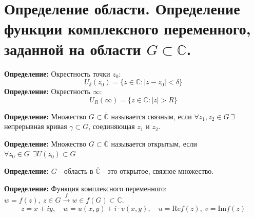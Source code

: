 \section{\texorpdfstring{Определение области. Определение функции
комплексного переменного, заданной на области
\(G \subset \mathbb{C}\).}{Определение области. Определение функции комплексного переменного, заданной на области G \textbackslash subset \textbackslash mathbb\{C\}.}}\label{ux43eux43fux440ux435ux434ux435ux43bux435ux43dux438ux435-ux43eux431ux43bux430ux441ux442ux438.-ux43eux43fux440ux435ux434ux435ux43bux435ux43dux438ux435-ux444ux443ux43dux43aux446ux438ux438-ux43aux43eux43cux43fux43bux435ux43aux441ux43dux43eux433ux43e-ux43fux435ux440ux435ux43cux435ux43dux43dux43eux433ux43e-ux437ux430ux434ux430ux43dux43dux43eux439-ux43dux430-ux43eux431ux43bux430ux441ux442ux438-g-subset-mathbbc.}

\textbf{Определение:} Окрестность точки \(z_{0}\): \[
U_{\delta}(z_{0})=\{ z\in \mathbb{C}:|z-z_{0}|<\delta \}
\] \textbf{Определение:} Окрестность \(\infty\): \[
U_{R}(\infty)=\{ z\in \mathbb{C}:|z|>R \}
\]

\textbf{Определение:} Множество \(G \subset \overline{\mathbb{C}}\)
называется связным, если \(\forall z_1, z_2 \in G\ \exists\) непрерывная
кривая \(\gamma \subset G\), соединяющая \(z_{1}\) и \(z_2\).

\textbf{Определение:} Множество \(G\subset \overline{\mathbb{C}}\)
называется открытым, если
\(\forall z_{0}\in G \ \ \exists U(z_{0})\subset G\)

\textbf{Определение:} \(G\) - область в \(\overline{\mathbb{C}}\) - это
открытое, связное множество.

\textbf{Определение:} Функция комплексного переменного:
\(w=f(z), \ z\in G \overset{f}{\to}w\in f(G)\subset \mathbb{C}\). \[
z=x+iy, \quad w=u(x,y)+i\cdot v(x,y), \quad u=\mathrm{Re}f(z), \ v=\mathrm{Im}f(z)
\]
